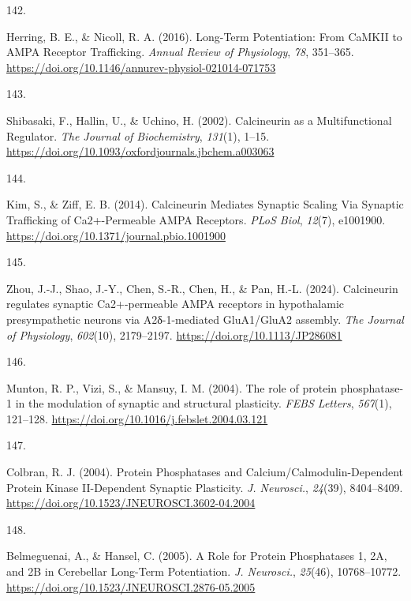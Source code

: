 \documentclass[
  11pt,
  letterpaper,
]{scrreprt}
\newlength{\cslhangindent}
\newlength{\csllabelwidth}
\newenvironment{CSLReferences}[2] %
 {\begin{list}{}{%
  \setlength{\itemindent}{0pt}
  \setlength{\leftmargin}{0pt}
  \setlength{\parsep}{0pt}
  \ifodd #1
   \setlength{\leftmargin}{\cslhangindent}
   \setlength{\itemindent}{-1\cslhangindent}
  \fi
  \setlength{\itemsep}{#2\baselineskip}}}
 {\end{list}}
\newcommand{\CSLLeftMargin}[1]{\parbox[t]{\csllabelwidth}{\strut#1\strut}}
\newcommand{\CSLRightInline}[1]{\parbox[t]{\linewidth - \csllabelwidth}{\strut#1\strut}}
\begin{document}
\begin{CSLReferences}{0}{0}
\CSLLeftMargin{142. }%
\CSLRightInline{Herring, B. E., \& Nicoll, R. A. (2016). Long-{Term
Potentiation}: {From CaMKII} to {AMPA Receptor Trafficking}.
\emph{Annual Review of Physiology}, \emph{78}, 351--365.
\url{https://doi.org/10.1146/annurev-physiol-021014-071753}}

\CSLLeftMargin{143. }%
\CSLRightInline{Shibasaki, F., Hallin, U., \& Uchino, H. (2002).
Calcineurin as a {Multifunctional Regulator}. \emph{The Journal of
Biochemistry}, \emph{131}(1), 1--15.
\url{https://doi.org/10.1093/oxfordjournals.jbchem.a003063}}

\CSLLeftMargin{144. }%
\CSLRightInline{Kim, S., \& Ziff, E. B. (2014). Calcineurin {Mediates
Synaptic Scaling Via Synaptic Trafficking} of {Ca2}+-{Permeable AMPA
Receptors}. \emph{PLoS Biol}, \emph{12}(7), e1001900.
\url{https://doi.org/10.1371/journal.pbio.1001900}}

\CSLLeftMargin{145. }%
\CSLRightInline{Zhou, J.-J., Shao, J.-Y., Chen, S.-R., Chen, H., \& Pan,
H.-L. (2024). Calcineurin regulates synaptic {Ca2}+-permeable {AMPA}
receptors in hypothalamic presympathetic neurons via Α2δ-1-mediated
{GluA1}/{GluA2} assembly. \emph{The Journal of Physiology},
\emph{602}(10), 2179--2197. \url{https://doi.org/10.1113/JP286081}}

\CSLLeftMargin{146. }%
\CSLRightInline{Munton, R. P., Vizi, S., \& Mansuy, I. M. (2004). The
role of protein phosphatase-1 in the modulation of synaptic and
structural plasticity. \emph{FEBS Letters}, \emph{567}(1), 121--128.
\url{https://doi.org/10.1016/j.febslet.2004.03.121}}

\CSLLeftMargin{147. }%
\CSLRightInline{Colbran, R. J. (2004). Protein {Phosphatases} and
{Calcium}/{Calmodulin-Dependent Protein Kinase II-Dependent Synaptic
Plasticity}. \emph{J. Neurosci.}, \emph{24}(39), 8404--8409.
\url{https://doi.org/10.1523/JNEUROSCI.3602-04.2004}}

\CSLLeftMargin{148. }%
\CSLRightInline{Belmeguenai, A., \& Hansel, C. (2005). A {Role} for
{Protein Phosphatases} 1, {2A}, and {2B} in {Cerebellar Long-Term
Potentiation}. \emph{J. Neurosci.}, \emph{25}(46), 10768--10772.
\url{https://doi.org/10.1523/JNEUROSCI.2876-05.2005}}


\end{CSLReferences}
\end{document}
